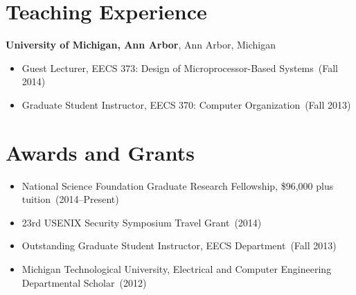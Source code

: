 \documentclass{article}
\begin{document}






\section*{Teaching Experience}
\vspace{-6pt}
{\bf University of Michigan, Ann Arbor}, Ann Arbor, Michigan
\vspace{-6pt}
\begin{itemize}
  \item[] Guest Lecturer, EECS 373: Design of Microprocessor-Based Systems~(Fall 2014)
  \item[] Graduate Student Instructor, EECS 370: Computer Organization~(Fall 2013)
\end{itemize}

\section*{Awards and Grants}
\vspace{-6pt}
\begin{itemize}
  \item[] National Science Foundation Graduate Research Fellowship, \$96,000 plus tuition~(2014--Present)
  \item[] 23rd USENIX Security Symposium Travel Grant~(2014)
  \item[] Outstanding Graduate Student Instructor, EECS Department~(Fall 2013)
  \item[] Michigan Technological University, Electrical and Computer Engineering Departmental Scholar~(2012)
\end{itemize}
\end{document}
